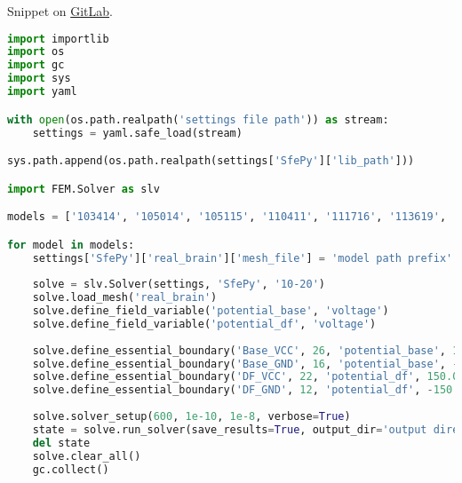 \pagebreak
\noindent Snippet on \href{https://gitlab.com/ttis-simulations/ttis-software/-/snippets/2067447}{GitLab}.
\begin{lstlisting}[language=Python,caption={\gls{PHM} model meshing},captionpos=b,label=lst:phm_model_meshsing]
import importlib
import os
import gc
import sys
import yaml

with open(os.path.realpath('settings file path')) as stream:
    settings = yaml.safe_load(stream)

sys.path.append(os.path.realpath(settings['SfePy']['lib_path']))

import FEM.Solver as slv

models = ['103414', '105014', '105115', '110411', '111716', '113619', '117122', '163129', '196750']

for model in models:
    settings['SfePy']['real_brain']['mesh_file'] = 'model path prefix' + model + 'model suffix'
    
    solve = slv.Solver(settings, 'SfePy', '10-20')
    solve.load_mesh('real_brain')
    solve.define_field_variable('potential_base', 'voltage')
    solve.define_field_variable('potential_df', 'voltage')
    
    solve.define_essential_boundary('Base_VCC', 26, 'potential_base', 150.0)
    solve.define_essential_boundary('Base_GND', 16, 'potential_base', -150.0)
    solve.define_essential_boundary('DF_VCC', 22, 'potential_df', 150.0)
    solve.define_essential_boundary('DF_GND', 12, 'potential_df', -150.0)
    
    solve.solver_setup(600, 1e-10, 1e-8, verbose=True)
    state = solve.run_solver(save_results=True, output_dir='output directory path', output_file_name='model prefix' + model + 'model suffix')
    del state
    solve.clear_all()
    gc.collect()
\end{lstlisting}

